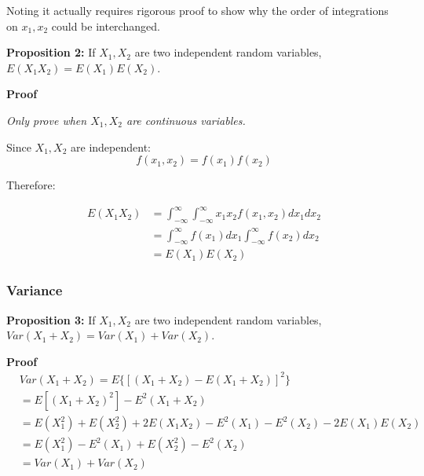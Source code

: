 \documentclass{article}
\begin{document}
Noting it actually requires rigorous proof to show why the order of
integrations on \(x_1, x_2\) could be interchanged.

\vspace{2mm}
\textbf{Proposition 2:} If \(X_1, X_2\) are two independent random variables,
\(E(X_1X_2)=E(X_1)E(X_2)\).

\vspace{2mm}
\textbf{Proof}

\textit{Only prove when \(X_1, X_2\) are continuous variables.}

Since \(X_1, X_2\) are independent:
\begin{equation}
    f(x_1, x_2)=f(x_1)f(x_2)
\end{equation}

Therefore:

\begin{equation}
\begin{split}
    E(X_1X_2)&=\int_{-\infty}^{\infty}\int_{-\infty}^{\infty}
    x_1x_2f(x_1, x_2)dx_1dx_2\\
    &=\int_{-\infty}^{\infty}f(x_1)dx_1\int_{-\infty}^{\infty}f(x_2)dx_2\\
    &=E(X_1)E(X_2)
\end{split}
\end{equation}

\subsubsection{Variance}

\vspace{2mm}
\textbf{Proposition 3:} If \(X_1, X_2\) are two independent random variables,
\(Var(X_1+X_2)=Var(X_1)+Var(X_2)\).

\vspace{2mm}
\textbf{Proof}
\begin{equation}
\begin{split}
    &Var(X_1+X_2)=E\{[(X_1+X_2)-E(X_1+X_2)]^2\}\\
    &=E[(X_1+X_2)^2]-E^2(X_1+X_2)\\
    &=E(X_1^2)+E(X_2^2)+2E(X_1X_2)-E^2(X_1)-E^2(X_2)-2E(X_1)E(X_2)\\
    &=E(X_1^2)-E^2(X_1)+E(X_2^2)-E^2(X_2)\\
    &=Var(X_1)+Var(X_2)
\end{split}
\end{equation}
\end{document}
